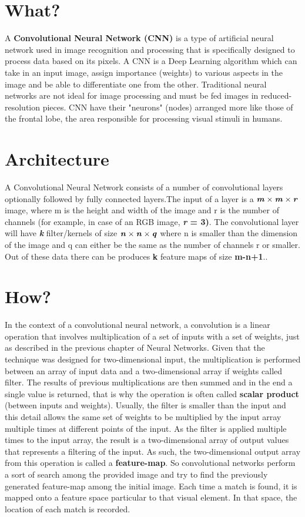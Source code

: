\documentclass[runningheads,a4paper,11pt]{report}
\begin{document}
\section{What?}
\label{section:what}
A \textbf{Convolutional Neural Network (CNN)} is a type of artificial neural network used in image recognition and processing that is specifically designed to process data based on its pixels. A CNN is a Deep Learning algorithm which can take in an input image, assign importance (weights) to various aspects in the image and be able to differentiate one from the other. Traditional neural networks are not ideal for image processing and must be fed images in reduced-resolution pieces. CNN have their "neurons" (nodes) arranged more like those of the frontal lobe, the area responsible for processing visual stimuli in humans.\cite{searchwhat}
\section{Architecture}
\label{section:architecture}
A Convolutional Neural Network consists of a number of convolutional layers optionally followed by fully connected layers.The input of a layer is a $\textbf{\textit{m}} \times \textbf{\textit{m}} \times \textbf{\textit{r}}$ image, where m is the height and width of the image and r is the number of channels (for example, in case of an RGB image, \textbf{\textit{r} = 3)}. The convolutional layer will have \textbf{\textit{k}} filter/kernels of size $\textbf{\textit{n}} \times \textbf{\textit{n}} \times \textbf{\textit{q}}$ where n is smaller than the dimension of the image and q can either be the same as the number of channels r or smaller. Out of these data there can be produces \textbf{k} feature maps of size \textbf{m-n+1}.\cite{stanford}.
\section{How?}
\label{section:how}
In the context of a convolutional neural network, a convolution is a linear operation that involves multiplication of a set of inputs with a set of weights, just as described in the previous chapter of Neural Networks. Given that the technique was designed for two-dimensional input, the multiplication is performed between an array of input data and a two-dimensional array if weights called filter.
The results of previous multiplications are then summed and in the end a single value is returned, that is why the operation is often called \textbf{scalar product} (between inputs and weights). Usually, the filter is smaller than the input and this detail allows the same set of weights to be multiplied by the input array multiple times at different points of the input. As the filter is applied multiple times to the input array, the result is a two-dimensional array of output values that represents a filtering of the input. As such, the two-dimensional output array from this operation is called a \textbf{feature-map}.
So convolutional networks perform a sort of search among the provided image and try to find the previously generated feature-map among the initial image. Each time a match is found, it is mapped onto a feature space particular to that visual element. In that space, the location of each match is recorded. 
\cite{machinelearning}
\end{document}
